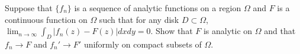 Suppose that $\{f_n\}$ is a sequence of analytic functions on a region
$\Omega$ and $F$ is a continuous function on $\Omega$ such that for
any disk $D\subset \Omega$, $\lim_{n\rightarrow
\infty}\int_D|f_n(z)-F(z)|dxdy=0$. Show that $F$ is analytic on
$\Omega$ and that $f_n\rightarrow F$ and $f_n'\rightarrow F'$
uniformly on compact subsets of $\Omega$.

